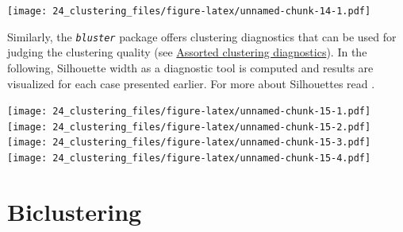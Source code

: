 \documentclass[
]{book}
\newenvironment{Shaded}{\begin{snugshade}}{\end{snugshade}}
\newcommand{\AttributeTok}[1]{\textcolor[rgb]{0.77,0.63,0.00}{#1}}
\newcommand{\CommentTok}[1]{\textcolor[rgb]{0.56,0.35,0.01}{\textit{#1}}}
\newcommand{\ControlFlowTok}[1]{\textcolor[rgb]{0.13,0.29,0.53}{\textbf{#1}}}
\newcommand{\FunctionTok}[1]{\textcolor[rgb]{0.00,0.00,0.00}{#1}}
\newcommand{\NormalTok}[1]{#1}
\newcommand{\OtherTok}[1]{\textcolor[rgb]{0.56,0.35,0.01}{#1}}
\newcommand{\SpecialCharTok}[1]{\textcolor[rgb]{0.00,0.00,0.00}{#1}}
\newcommand{\StringTok}[1]{\textcolor[rgb]{0.31,0.60,0.02}{#1}}
\begin{document}
\texttt{[image: 24\_clustering\_files/figure-latex/unnamed-chunk-14-1.pdf]}

Similarly, the \emph{\texttt{bluster}} \citep{R_bluster} package offers clustering
diagnostics that can be used for judging the clustering quality (see
\href{http://bioconductor.org/packages/release/bioc/vignettes/bluster/inst/doc/diagnostics.html}{Assorted clustering
diagnostics}).
In the following, Silhouette width as a diagnostic tool is computed
and results are visualized for each case presented earlier. For more
about Silhouettes read \citep{Rousseeuw1987}.

\begin{Shaded}
\end{Shaded}

\texttt{[image: 24\_clustering\_files/figure-latex/unnamed-chunk-15-1.pdf]} \texttt{[image: 24\_clustering\_files/figure-latex/unnamed-chunk-15-2.pdf]} \texttt{[image: 24\_clustering\_files/figure-latex/unnamed-chunk-15-3.pdf]} \texttt{[image: 24\_clustering\_files/figure-latex/unnamed-chunk-15-4.pdf]}

\hypertarget{biclustering}{%
\section{Biclustering}\label{biclustering}}
\end{document}
